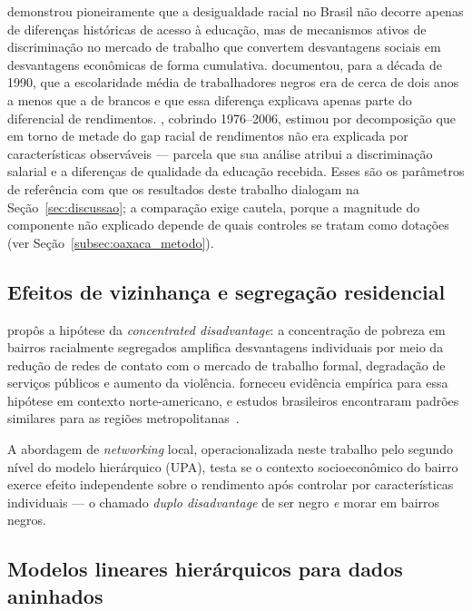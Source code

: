 \documentclass[12pt, a4paper, oneside]{article}
\let\oldsubsectionFB\subsection
\renewcommand{\subsection}{\FloatBarrier\oldsubsectionFB}
\begin{document}
 demonstrou pioneiramente que a desigualdade racial
no Brasil não decorre apenas de diferenças históricas de acesso à educação,
mas de mecanismos ativos de discriminação no mercado de trabalho que
convertem desvantagens sociais em desvantagens econômicas de forma cumulativa.
 documentou, para a década de 1990, que a escolaridade
média de trabalhadores negros era de cerca de dois anos a menos que a de
brancos e que essa diferença explicava apenas parte do diferencial de
rendimentos. , cobrindo 1976--2006, estimou por decomposição
que em torno de metade do gap racial de rendimentos não era explicada por
características observáveis --- parcela que sua análise atribui a
discriminação salarial e a diferenças de qualidade da educação recebida. Esses
são os parâmetros de referência com que os resultados deste trabalho dialogam
na Seção~\ref{sec:discussao}; a comparação exige cautela, porque a magnitude do
componente não explicado depende de quais controles se tratam como dotações
(ver Seção~\ref{subsec:oaxaca_metodo}).

\subsection{Efeitos de vizinhança e segregação residencial}

 propôs a hipótese da \textit{concentrated disadvantage}:
a concentração de pobreza em bairros racialmente segregados amplifica
desvantagens individuais por meio da redução de redes de contato com
o mercado de trabalho formal, degradação de serviços públicos e aumento
da violência.  forneceu evidência empírica para essa
hipótese em contexto norte-americano, e estudos brasileiros encontraram
padrões similares para as regiões metropolitanas~\cite{marques2010}.

A abordagem de \textit{networking} local, operacionalizada neste trabalho
pelo segundo nível do modelo hierárquico (UPA), testa se o contexto
socioeconômico do bairro exerce efeito independente sobre o rendimento
após controlar por características individuais --- o chamado
\textit{duplo disadvantage} de ser negro \textit{e} morar em bairros negros.

\subsection{Modelos lineares hierárquicos para dados aninhados}
\end{document}
